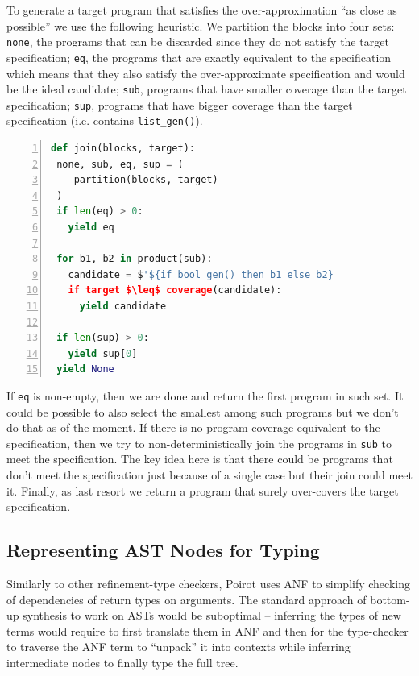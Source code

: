 \documentclass[review, sigplan]{acmart}
\begin{document}
To generate a target program that satisfies the over-approximation
``as close as possible'' we use the following heuristic.
We partition the blocks into four sets:
\lstinline[language=caml, basicstyle=\small\ttfamily, mathescape]|none|,
the programs that can be discarded since they do not satisfy the target
specification;
\lstinline[language=caml, basicstyle=\small\ttfamily, mathescape]|eq|,
the programs that are exactly equivalent to the specification which
means that they also satisfy the over-approximate specification and
would be the ideal candidate;
\lstinline[language=caml, basicstyle=\small\ttfamily, mathescape]|sub|,
programs that have smaller coverage than the target specification;
\lstinline[language=caml, basicstyle=\small\ttfamily, mathescape]|sup|,
programs that have bigger coverage than the target specification
(i.e. contains \lstinline[language=caml, basicstyle=\small\ttfamily, mathescape]|list_gen()|).

\begin{lstlisting}[language=Python, basicstyle=\small\ttfamily, mathescape, numbers=left, numbersep=3pt]
def join(blocks, target):
 none, sub, eq, sup = (
    partition(blocks, target)
 )
 if len(eq) > 0:
   yield eq

 for b1, b2 in product(sub):
   candidate = $'${if bool_gen() then b1 else b2}
   if target $\leq$ coverage(candidate):
     yield candidate

 if len(sup) > 0:
   yield sup[0]
 yield None
\end{lstlisting}

If \lstinline[language=caml, basicstyle=\small\ttfamily, mathescape]|eq| is non-empty,
then we are done and return the first program in such set. It could be possible
to also select the smallest among such programs but we don't do that as of the moment.
If there is no program coverage-equivalent to the specification, then
we try to non-deterministically join the programs
in \lstinline[language=caml, basicstyle=\small\ttfamily, mathescape]|sub| to meet
the specification.
The key idea here is that there could be programs that don't meet
the specification just because of a single case but their join
could meet it.
Finally, as last resort we return a program that surely over-covers
the target specification.

\subsection{Representing AST Nodes for Typing}
Similarly to other refinement-type checkers, Poirot uses
ANF to simplify checking of dependencies of return types on arguments.
The standard approach of bottom-up synthesis to work on ASTs would
be suboptimal -- inferring the types of new terms would require to
first translate them in ANF and then for the type-checker to traverse
the ANF term to ``unpack'' it into contexts while inferring intermediate
nodes to finally type the full tree.
\end{document}
